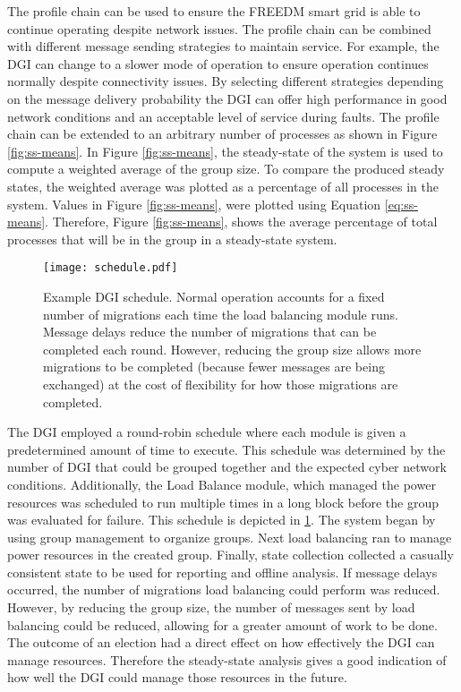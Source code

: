 The profile chain can be used to ensure the \ac{FREEDM} smart grid is able to continue operating despite network issues.
The profile chain can be combined with different message sending strategies to maintain service.
For example, the DGI can change to a slower mode of operation to ensure operation continues normally despite connectivity issues.
By selecting different strategies depending on the message delivery probability the DGI can offer high performance in good network conditions and an acceptable level of service during faults.
The profile chain can be extended to an arbitrary number of processes as shown in Figure \ref{fig:ss-means}.
In Figure \ref{fig:ss-means}, the steady-state of the system is used to compute a weighted average of the group size.
To compare the produced steady states, the weighted average was plotted as a percentage of all processes in the system.
Values in Figure \ref{fig:ss-means}, were plotted using Equation \ref{eq:ss-means}.
Therefore, Figure \ref{fig:ss-means}, shows the average percentage of total processes that will be in the group in a steady-state system.

\begin{figure}
    \centering
    \texttt{[image: schedule.pdf]}
    \caption[Example DGI schedule]{Example DGI schedule. Normal operation accounts for a fixed number of migrations each time the load balancing module runs. Message delays reduce the number of migrations that can be completed each round. However, reducing the group size allows more migrations to be completed (because fewer messages are being exchanged) at the cost of flexibility for how those migrations are completed.}
    \label{fig:schedule}
\end{figure}

The DGI employed a round-robin schedule where each module is given a predetermined amount of time to execute.
This schedule was determined by the number of DGI that could be grouped together and the expected cyber network conditions.
Additionally, the Load Balance module, which managed the power resources was scheduled to run multiple times in a long block before the group was evaluated for failure.
This schedule is depicted in \ref{fig:schedule}.
The system began by using group management to organize groups.
Next load balancing ran to manage power resources in the created group.
Finally, state collection collected a casually consistent state to be used for reporting and offline analysis.
If message delays occurred, the number of migrations load balancing could perform was reduced.
However, by reducing the group size, the number of messages sent by load balancing could be reduced, allowing for a greater amount of work to be done.
The outcome of an election had a direct effect on how effectively the DGI can manage resources.
Therefore the steady-state analysis gives a good indication of how well the DGI could manage those resources in the future.

